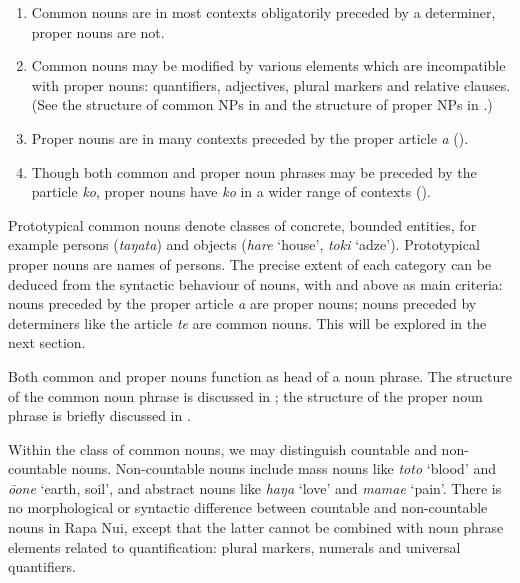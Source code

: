 \begin{enumerate}
\item 
Common nouns are in most contexts obligatorily preceded by a determiner, proper nouns are not. 

\item 
Common nouns may be modified by various elements which are incompatible with proper nouns: quantifiers, adjectives, plural markers and relative clauses. (See the structure of common NPs in  and the structure of proper NPs in .)

\item 
Proper nouns are in many contexts preceded by the proper article \textit{a} ().

\item 
Though both common and proper noun phrases may be preceded by the particle \textit{ko}, proper nouns have \textit{ko} in a wider range of contexts ().

\end{enumerate}

Prototypical common nouns denote classes of concrete, bounded entities, for example persons (\textit{taŋata}) and objects (\textit{hare} ‘house’, \textit{toki} ‘adze’). Prototypical proper nouns are names of persons. The precise extent of each category can be deduced from the syntactic behaviour of nouns, with  and  above as main criteria: nouns preceded by the proper article \textit{a} are proper nouns; nouns preceded by determiners like the article \textit{te} are common nouns. This will be explored in the next section.

Both common and proper nouns function as head of a noun phrase. The structure of the common noun phrase is discussed in ; the structure of the proper noun phrase is briefly discussed in .

Within the class of common nouns, we may distinguish countable and non-countable nouns. Non-countable nouns include mass nouns like \textit{toto} ‘blood’ and \textit{{\ꞌ}ō{\ꞌ}one} ‘earth, soil’, and abstract nouns like \textit{haŋa} ‘love’ and \textit{mamae} ‘pain’. There is no morphological or syntactic difference between countable and non-countable nouns in Rapa Nui, except that the latter cannot be combined with noun phrase elements related to quantification: plural markers, numerals and universal quantifiers.

